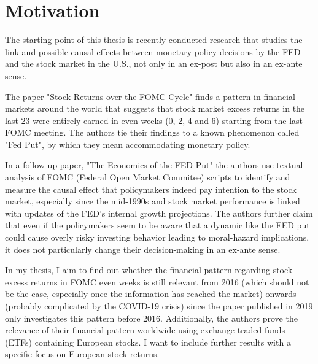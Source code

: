 
\chapter{Motivation}

The starting point of this thesis is recently conducted research that studies the link and possible causal effects between monetary policy decisions by the FED and the stock market in the U.S., not only in an ex-post but also in an ex-ante sense.

The paper "Stock Returns over the FOMC Cycle" \parencite{cieslak_stock_2019} finds a pattern in financial markets around the world that suggests that stock market excess returns in the last 23 were entirely earned in even weeks (0, 2, 4 and 6) starting from the last FOMC meeting. The authors tie their findings to a known phenomenon called "Fed Put", by which they mean accommodating monetary policy.

In a follow-up paper, "The Economics of the FED Put" \parencite{cieslak_economics_2021} the authors use textual analysis of FOMC (Federal Open Market Commitee) scripts to identify and measure the causal effect that policymakers indeed pay intention to the stock market, especially since the mid-1990s and stock market performance is linked with updates of the FED’s internal growth projections.  The authors further claim that even if the policymakers seem to be aware that a dynamic like the FED put could cause overly risky investing behavior leading to moral-hazard implications,  it does not particularly change their decision-making in an ex-ante sense.

In my thesis,  I aim to find out whether the financial pattern regarding stock excess returns in FOMC even weeks is still relevant from 2016 (which should not be the case, especially once the information has reached the market) onwards (probably complicated by the COVID-19 crisis) since the paper published in 2019 only investigates this pattern before 2016. Additionally, the authors prove the relevance of their financial pattern worldwide using exchange-traded funds (ETFs) containing European stocks. I want to include further results with a specific focus on European stock returns.


